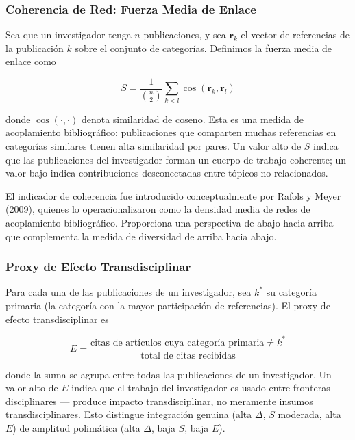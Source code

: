 \documentclass[
]{article}
\begin{document}
\hypertarget{coherencia-de-red-fuerza-media-de-enlace}{%
\subsubsection{Coherencia de Red: Fuerza Media de
Enlace}\label{coherencia-de-red-fuerza-media-de-enlace}}

Sea que un investigador tenga \(n\) publicaciones, y sea
\(\mathbf{r}_k\) el vector de referencias de la publicación \(k\) sobre
el conjunto de categorías. Definimos la fuerza media de enlace como

\[S = \frac{1}{\binom{n}{2}} \sum_{k < l} \cos(\mathbf{r}_k, \mathbf{r}_l)\]

donde \(\cos(\cdot, \cdot)\) denota similaridad de coseno. Esta es una
medida de acoplamiento bibliográfico: publicaciones que comparten muchas
referencias en categorías similares tienen alta similaridad por pares.
Un valor alto de \(S\) indica que las publicaciones del investigador
forman un cuerpo de trabajo coherente; un valor bajo indica
contribuciones desconectadas entre tópicos no relacionados.

El indicador de coherencia fue introducido conceptualmente por Rafols y
Meyer (2009), quienes lo operacionalizaron como la densidad media de
redes de acoplamiento bibliográfico. Proporciona una perspectiva de
abajo hacia arriba que complementa la medida de diversidad de arriba
hacia abajo.

\hypertarget{proxy-de-efecto-transdisciplinar}{%
\subsubsection{Proxy de Efecto
Transdisciplinar}\label{proxy-de-efecto-transdisciplinar}}

Para cada una de las publicaciones de un investigador, sea \(k^*\) su
categoría primaria (la categoría con la mayor participación de
referencias). El proxy de efecto transdisciplinar es

\[E = \frac{\text{citas de artículos cuya categoría primaria} \neq k^*}{\text{total de citas recibidas}}\]

donde la suma se agrupa entre todas las publicaciones de un
investigador. Un valor alto de \(E\) indica que el trabajo del
investigador es usado entre fronteras disciplinares --- produce impacto
transdisciplinar, no meramente insumos transdisciplinares. Esto
distingue integración genuina (alta \(\Delta\), \(S\) moderada, alta
\(E\)) de amplitud polimática (alta \(\Delta\), baja \(S\), baja \(E\)).
\end{document}
